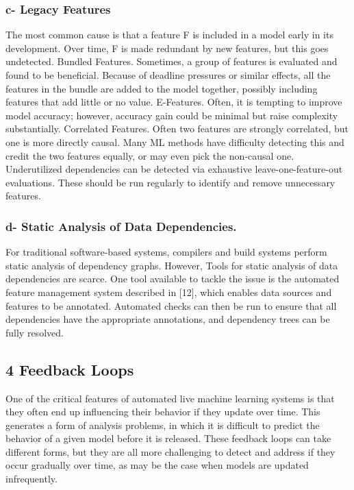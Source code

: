 \documentclass[]{article}
\begin{document}
\subsubsection{c- Legacy Features}\label{c--legacy-features}

The most common cause is that a feature F is included in a model early
in its development. Over time, F is made redundant by new features, but
this goes undetected. Bundled Features. Sometimes, a group of features
is evaluated and found to be beneficial. Because of deadline pressures
or similar effects, all the features in the bundle are added to the
model together, possibly including features that add little or no value.
E-Features. Often, it is tempting to improve model accuracy; however,
accuracy gain could be minimal but raise complexity substantially.
Correlated Features. Often two features are strongly correlated, but one
is more directly causal. Many ML methods have difficulty detecting this
and credit the two features equally, or may even pick the non-causal
one. Underutilized dependencies can be detected via exhaustive
leave-one-feature-out evaluations. These should be run regularly to
identify and remove unnecessary features.

\subsubsection{d- Static Analysis of Data
Dependencies.}\label{d--static-analysis-of-data-dependencies.}

For traditional software-based systems, compilers and build systems
perform static analysis of dependency graphs. However, Tools for static
analysis of data dependencies are scarce. One tool available to tackle
the issue is the automated feature management system described in
{[}12{]}, which enables data sources and features to be annotated.
Automated checks can then be run to ensure that all dependencies have
the appropriate annotations, and dependency trees can be fully resolved.

\subsection{4 Feedback Loops}\label{feedback-loops}

One of the critical features of automated live machine learning systems
is that they often end up influencing their behavior if they update over
time. This generates a form of analysis problems, in which it is
difficult to predict the behavior of a given model before it is
released. These feedback loops can take different forms, but they are
all more challenging to detect and address if they occur gradually over
time, as may be the case when models are updated infrequently.
\end{document}
